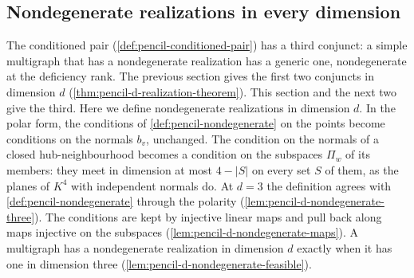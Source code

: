 \subsection{Nondegenerate realizations in every dimension}
\label{sec:pencil-d-nondegenerate}

The conditioned pair (\cref{def:pencil-conditioned-pair}) has a third
conjunct: a simple multigraph that has a nondegenerate realization has
a generic one, nondegenerate at the deficiency rank. The previous
section gives the first two conjuncts in dimension $d$
(\cref{thm:pencil-d-realization-theorem}). This section and the next
two give the third. Here we define nondegenerate realizations in
dimension $d$. In the polar form, the conditions of
\cref{def:pencil-nondegenerate} on the points become conditions on the
normals $b_v$, unchanged. The condition on the normals of a closed
hub-neighbourhood becomes a condition on the subspaces $\Pi_w$ of its
members: they meet in dimension at most $4 - |S|$ on every set $S$ of
them, as the planes of $K^4$ with independent normals do. At $d = 3$
the definition agrees with \cref{def:pencil-nondegenerate} through the
polarity (\cref{lem:pencil-d-nondegenerate-three}). The conditions are
kept by injective linear maps and pull back along maps injective on the
subspaces (\cref{lem:pencil-d-nondegenerate-maps}). A multigraph has a
nondegenerate realization in dimension $d$ exactly when it has one in
dimension three (\cref{lem:pencil-d-nondegenerate-feasible}).

